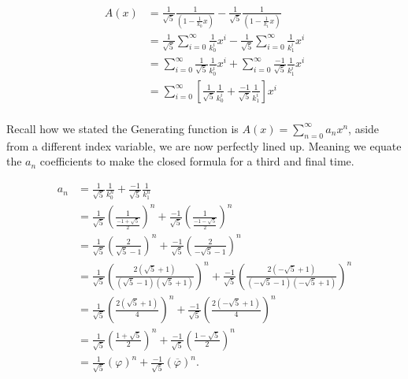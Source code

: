 \documentclass{article}
\begin{document}
\begin{align*}
    A(x)&=\frac{1}{\sqrt{5}}\frac{1}{(1-\frac{1}{k_0}x)}-\frac{1}{\sqrt{5}}\frac{1}{(1-\frac{1}{k_1}x)} \\
        &=\frac{1}{\sqrt{5}}\sum_{i=0}^{\infty} \frac{1}{k_0^i}x^i-\frac{1}{\sqrt{5}}\sum_{i=0}^{\infty} \frac{1}{k_1^i}x^i \\
        &=\sum_{i=0}^{\infty} \frac{1}{\sqrt{5}} \frac{1}{k_0^i}x^i+\sum_{i=0}^{\infty}\frac{-1}{\sqrt{5}} \frac{1}{k_1^i}x^i \\
        &=\sum_{i=0}^{\infty} \left[\frac{1}{\sqrt{5}} \frac{1}{k_0^i}+\frac{-1}{\sqrt{5}} \frac{1}{k_1^i}\right]x^i \\
\end{align*}

Recall how we stated the Generating function is $A(x)=\sum_{n=0}^{\infty}a_nx^n$, aside from a different index variable, we are now perfectly lined up. Meaning we equate the $a_n$ coefficients to make the closed formula for a third and final time.

\begin{align*}
    a_n &=\frac{1}{\sqrt{5}} \frac{1}{k_0^n}+\frac{-1}{\sqrt{5}} \frac{1}{k_1^n} \\
        &=\frac{1}{\sqrt{5}} \left(\frac{1}{\frac{-1+\sqrt{5}}{2}}\right)^n+\frac{-1}{\sqrt{5}} \left(\frac{1}{\frac{-1-\sqrt{5}}{2}}\right)^n \\
        &=\frac{1}{\sqrt{5}} \left(\frac{2}{\sqrt{5}-1}\right)^n+\frac{-1}{\sqrt{5}} \left(\frac{2}{-\sqrt{5}-1}\right)^n \\
        &=\frac{1}{\sqrt{5}} \left(\frac{2(\sqrt{5}+1)}{(\sqrt{5}-1)(\sqrt{5}+1)}\right)^n+\frac{-1}{\sqrt{5}} \left(\frac{2(-\sqrt{5}+1)}{(-\sqrt{5}-1)(-\sqrt{5}+1)}\right)^n \\
        &=\frac{1}{\sqrt{5}} \left(\frac{2(\sqrt{5}+1)}{4}\right)^n+\frac{-1}{\sqrt{5}} \left(\frac{2(-\sqrt{5}+1)}{4}\right)^n \\
        &=\frac{1}{\sqrt{5}} \left(\frac{1+\sqrt{5}}{2}\right)^n+\frac{-1}{\sqrt{5}} \left(\frac{1-\sqrt{5}}{2}\right)^n \\
        &=\frac{1}{\sqrt{5}} \left(\varphi\right)^n+\frac{-1}{\sqrt{5}} \left(\overline{\varphi}\right)^n.
\end{align*}
\end{document}
